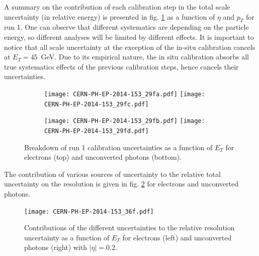 A summary on the contribution of each calibration step in the total scale uncertainty (in relative energy) is presented in fig. \ref{org2897df4} as a function of $\eta$ and $p_T$ for run 1.
One can observe that different systematics are depending on the particle energy, so different analyses will be limited by different effects.
It is important to notice that all scale uncertainty at the exception of the in-situ calibration cancels at $E_T=45$~GeV.
Due to its empirical nature, the in situ calibration absorbs all true systematics effects of the previous calibration steps, hence cancels their uncertainties.

\begin{figure}
  \centering
\begin{subfigure}[t]{0.49\linewidth}
  \texttt{[image: CERN-PH-EP-2014-153\_29fa.pdf]}
  \texttt{[image: CERN-PH-EP-2014-153\_29fc.pdf]}
\end{subfigure}
\begin{subfigure}[t]{0.49\linewidth}
    \texttt{[image: CERN-PH-EP-2014-153\_29fb.pdf]}
    \texttt{[image: CERN-PH-EP-2014-153\_29fd.pdf]}
\end{subfigure}
\caption{\label{org2897df4}
  Breakdown of run 1 calibration uncertainties as a function of $E_T$ for electrons (top) and unconverted photons (bottom). \cite{CERN-PH-EP-2014-153}}
\end{figure}

The contribution of various sources of uncertainty to the relative total uncertainty on the resolution is given in fig. \ref{fig:Calibration_totResUnc} for electrons and unconverted photons.

\begin{figure}[htbp]
\centering
\texttt{[image: CERN-PH-EP-2014-153\_36f.pdf]}
\caption{\label{fig:Calibration_totResUnc}
  Contributions of the different uncertainties to the relative resolution uncertainty as a function of $E_T$ for electrons (left) and unconverted photons (right) with $|\eta|=0.2$.
  \cite{CERN-PH-EP-2014-153}}
\end{figure}
